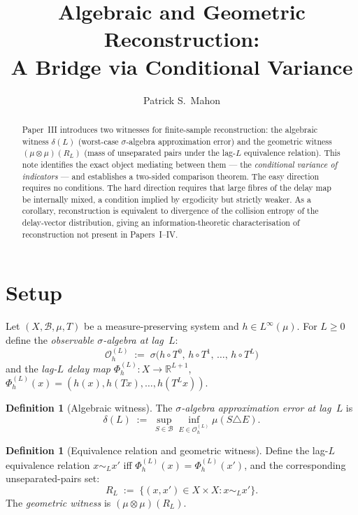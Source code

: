 \documentclass[11pt]{article}
\title{Algebraic and Geometric Reconstruction:\\
\large A Bridge via Conditional Variance}
\author{Patrick S.\ Mahon}
\date{}
\theoremstyle{definition}
\newtheorem{definition}[theorem]{Definition}
\newcommand{\Bcal}{\mathcal{B}}
\newcommand{\OL}{\mathcal{O}_h^{(L)}}
\newcommand{\PhiL}{\Phi_h^{(L)}}
\newcommand{\Lp}[1]{L^{#1}}
\newcommand{\RL}{R_L}
\newcommand{\dL}{\delta(L)}
\begin{document}
\maketitle

\begin{abstract}
Paper~III introduces two witnesses for finite-sample reconstruction: the
algebraic witness $\delta(L)$ (worst-case $\sigma$-algebra approximation error)
and the geometric witness $(\mu \otimes \mu)(R_L)$ (mass of unseparated pairs
under the lag-$L$ equivalence relation).
This note identifies the exact object mediating between them --- the
\emph{conditional variance of indicators} --- and establishes a two-sided
comparison theorem.
The easy direction requires no conditions.
The hard direction requires that large fibres of the delay map be internally
mixed, a condition implied by ergodicity but strictly weaker.
As a corollary, reconstruction is equivalent to divergence of the collision
entropy of the delay-vector distribution, giving an information-theoretic
characterisation of reconstruction not present in Papers~I--IV.
\end{abstract}

\section{Setup}

Let $(X, \Bcal, \mu, T)$ be a measure-preserving system and $h \in \Lp{\infty}(\mu)$.
For $L \geq 0$ define the \emph{observable $\sigma$-algebra at lag~$L$}:
\[
  \OL \;:=\; \sigma\bigl(h \circ T^0,\, h \circ T^1,\, \ldots,\, h \circ T^L\bigr)
\]
and the \emph{lag-$L$ delay map} $\PhiL : X \to \mathbb{R}^{L+1}$,
$\PhiL(x) = (h(x), h(Tx), \ldots, h(T^L x))$.

\begin{definition}[Algebraic witness]
The \emph{$\sigma$-algebra approximation error at lag~$L$} is
\[
  \dL \;:=\; \sup_{S \in \Bcal} \inf_{E \in \OL} \mu(S \triangle E).
\]
\end{definition}

\begin{definition}[Equivalence relation and geometric witness]
Define the lag-$L$ equivalence relation $x \sim_L x'$ iff
$\PhiL(x) = \PhiL(x')$, and the corresponding unseparated-pairs set:
\[
  \RL \;:=\; \bigl\{(x,x') \in X \times X : x \sim_L x'\bigr\}.
\]
The \emph{geometric witness} is $(\mu \otimes \mu)(\RL)$.
\end{definition}
\end{document}
